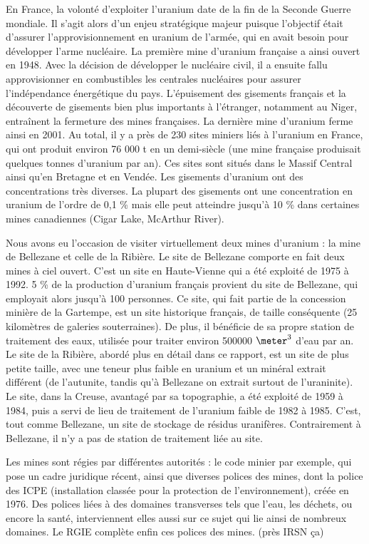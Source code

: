 \documentclass{article}
\begin{document}
En France, la volonté d’exploiter l’uranium date de la fin de la Seconde Guerre mondiale. Il s’agit alors d’un enjeu stratégique majeur puisque l’objectif était d’assurer l’approvisionnement en uranium de l’armée, qui en avait besoin pour développer l’arme nucléaire. La première mine d’uranium française a ainsi ouvert en 1948. Avec la décision de développer le nucléaire civil, il a ensuite fallu approvisionner en combustibles les centrales nucléaires pour assurer l’indépendance énergétique du pays. L’épuisement des gisements français et la découverte de gisements bien plus importants à l’étranger, notamment au Niger, entraînent la fermeture des mines françaises. La dernière mine d’uranium ferme ainsi en 2001. Au total, il y a près de 230 sites miniers liés à l’uranium en France, qui ont produit environ 76 000 t en un demi-siècle (une mine française produisait quelques tonnes d’uranium par an). Ces sites sont situés dans le Massif Central ainsi qu’en Bretagne et en Vendée.
Les gisements d’uranium ont des concentrations très diverses. La plupart des gisements ont une concentration en uranium de l’ordre de 0,1 \% mais elle peut atteindre jusqu’à 10 \% dans certaines mines canadiennes (Cigar Lake, McArthur River).

Nous avons eu l’occasion de visiter virtuellement deux mines d’uranium : la mine de Bellezane et celle de la Ribière. Le site de Bellezane comporte en fait deux mines à ciel ouvert. C’est un site en Haute-Vienne qui a été exploité de 1975 à 1992. 5 \% de la production d’uranium français provient du site de Bellezane, qui employait alors jusqu’à 100 personnes. Ce site, qui fait partie de la concession minière de la Gartempe, est un site historique français, de taille conséquente (25 kilomètres de galeries souterraines). De plus, il bénéficie de sa propre station de traitement des eaux, utilisée pour traiter environ 500000 $\meter^3$ d’eau par an.
Le site de la Ribière, abordé plus en détail dans ce rapport, est un site de plus petite taille, avec une teneur plus faible en uranium et un minéral extrait différent (de l’autunite, tandis qu’à Bellezane on extrait surtout de l’uraninite). Le site, dans la Creuse, avantagé par sa topographie, a été exploité de 1959 à 1984, puis a servi de lieu de traitement de l’uranium faible de 1982 à 1985. C’est, tout comme Bellezane, un site de stockage de résidus uranifères. Contrairement à Bellezane, il n’y a pas de station de traitement liée au site.


Les mines sont régies par différentes autorités : le code minier par exemple, qui pose un cadre juridique récent, ainsi que diverses polices des mines, dont la police des ICPE (installation classée pour la protection de l’environnement), créée en 1976. 
Des polices liées à des domaines transverses tels que l’eau, les déchets, ou encore la santé, interviennent elles aussi sur ce sujet qui lie ainsi de nombreux domaines. Le RGIE complète enfin ces polices des mines. (près IRSN ça)
\end{document}
